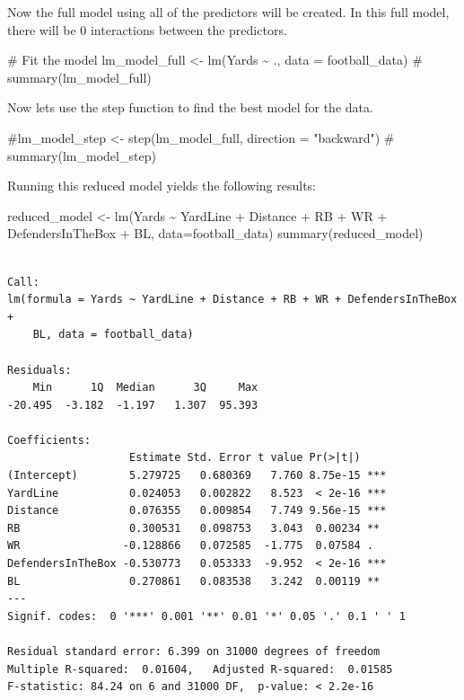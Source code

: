 \documentclass[
  super,
  preprint,
  3p]{elsarticle}
\newenvironment{Shaded}{\begin{snugshade}}{\end{snugshade}}
\newcommand{\AttributeTok}[1]{\textcolor[rgb]{0.40,0.45,0.13}{#1}}
\newcommand{\CommentTok}[1]{\textcolor[rgb]{0.37,0.37,0.37}{#1}}
\newcommand{\FunctionTok}[1]{\textcolor[rgb]{0.28,0.35,0.67}{#1}}
\newcommand{\NormalTok}[1]{\textcolor[rgb]{0.00,0.23,0.31}{#1}}
\newcommand{\OtherTok}[1]{\textcolor[rgb]{0.00,0.23,0.31}{#1}}
\newcommand{\SpecialCharTok}[1]{\textcolor[rgb]{0.37,0.37,0.37}{#1}}
\begin{document}
Now the full model using all of the predictors will be created. In this
full model, there will be 0 interactions between the predictors.

\begin{Shaded}
\begin{Highlighting}[]
\CommentTok{\# Fit the model}
\NormalTok{lm\_model\_full }\OtherTok{\textless{}{-}} \FunctionTok{lm}\NormalTok{(Yards }\SpecialCharTok{\textasciitilde{}}\NormalTok{ ., }\AttributeTok{data =}\NormalTok{ football\_data)}
\CommentTok{\# summary(lm\_model\_full)}
\end{Highlighting}
\end{Shaded}

Now lets use the step function to find the best model for the data.

\begin{Shaded}
\begin{Highlighting}[]
\CommentTok{\#lm\_model\_step \textless{}{-} step(lm\_model\_full, direction = "backward")}
\CommentTok{\# summary(lm\_model\_step)}
\end{Highlighting}
\end{Shaded}

Running this reduced model yields the following results:

\begin{Shaded}
\begin{Highlighting}[]
\NormalTok{reduced\_model }\OtherTok{\textless{}{-}} \FunctionTok{lm}\NormalTok{(Yards }\SpecialCharTok{\textasciitilde{}}\NormalTok{ YardLine }\SpecialCharTok{+}\NormalTok{ Distance }\SpecialCharTok{+}\NormalTok{ RB }\SpecialCharTok{+}\NormalTok{ WR }\SpecialCharTok{+}\NormalTok{ DefendersInTheBox }\SpecialCharTok{+}\NormalTok{ BL, }\AttributeTok{data=}\NormalTok{football\_data)}
\FunctionTok{summary}\NormalTok{(reduced\_model)}
\end{Highlighting}
\end{Shaded}

\begin{verbatim}

Call:
lm(formula = Yards ~ YardLine + Distance + RB + WR + DefendersInTheBox + 
    BL, data = football_data)

Residuals:
    Min      1Q  Median      3Q     Max 
-20.495  -3.182  -1.197   1.307  95.393 

Coefficients:
                   Estimate Std. Error t value Pr(>|t|)    
(Intercept)        5.279725   0.680369   7.760 8.75e-15 ***
YardLine           0.024053   0.002822   8.523  < 2e-16 ***
Distance           0.076355   0.009854   7.749 9.56e-15 ***
RB                 0.300531   0.098753   3.043  0.00234 ** 
WR                -0.128866   0.072585  -1.775  0.07584 .  
DefendersInTheBox -0.530773   0.053333  -9.952  < 2e-16 ***
BL                 0.270861   0.083538   3.242  0.00119 ** 
---
Signif. codes:  0 '***' 0.001 '**' 0.01 '*' 0.05 '.' 0.1 ' ' 1

Residual standard error: 6.399 on 31000 degrees of freedom
Multiple R-squared:  0.01604,   Adjusted R-squared:  0.01585 
F-statistic: 84.24 on 6 and 31000 DF,  p-value: < 2.2e-16
\end{verbatim}
\end{document}
